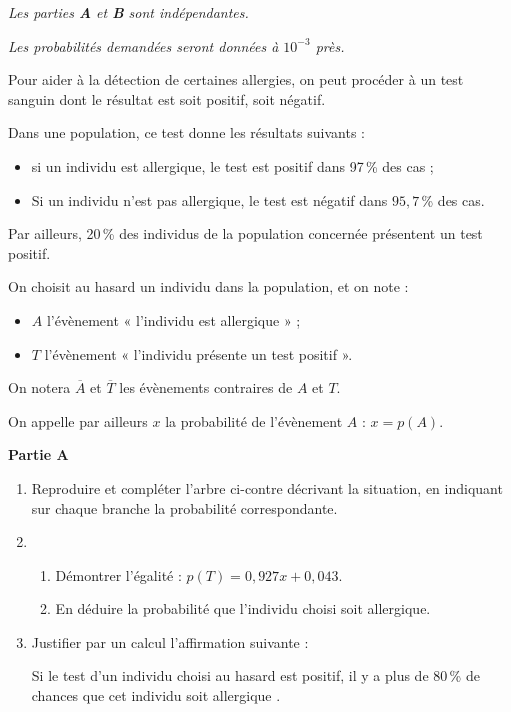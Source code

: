 \textit{Les parties \textbf{A} et \textbf{B} sont indépendantes.}

\textit{Les probabilités demandées seront données à $10^{-3}$ près.}

\smallskip

Pour aider à la détection de certaines allergies, on peut procéder à un test sanguin dont le résultat est soit positif, soit négatif.

Dans une population, ce test donne les résultats suivants :

\begin{itemize}
	\item si un individu est allergique, le test est positif dans 97\,\% des cas ;
	\item Si un individu n’est pas allergique, le test est négatif dans $95,7$\,\% des cas.
\end{itemize}

Par ailleurs, 20\,\% des individus de la population concernée présentent un test positif.

\smallskip

On choisit au hasard un individu dans la population, et on note :

\begin{itemize}
	\item $A$ l’évènement « l’individu est allergique » ;
	\item $T$ l’évènement « l’individu présente un test positif ».
\end{itemize}

On notera $\overline{A}$ et $\overline{T}$ les évènements contraires de $A$ et $T$.

On appelle par ailleurs $x$ la probabilité de l’évènement $A$ : $x = p(A)$.

\medskip

\textbf{Partie A}

\begin{wrapstuff}[r]
\end{wrapstuff}

\begin{enumerate}
	\item Reproduire et compléter l’arbre ci-contre décrivant la situation, en indiquant sur chaque branche la probabilité correspondante.
	\item 
	\begin{enumerate}
		\item Démontrer l’égalité : $p(T) = 0,927x +0,043$.
		\item En déduire la probabilité que l’individu choisi soit allergique.
	\end{enumerate}
	\item Justifier par un calcul l’affirmation suivante :
	
	\og Si le test d’un individu choisi au hasard est positif, il y a plus de 80\,\% de chances que cet individu soit allergique \fg.
\end{enumerate}

